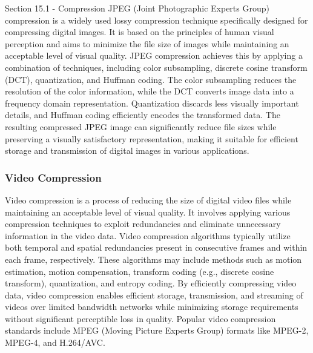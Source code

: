 \begin{notes}{Section 15.1 - Compression}
    JPEG (Joint Photographic Experts Group) compression is a widely used lossy compression technique specifically designed for compressing digital images. It is based on the principles of human visual 
    perception and aims to minimize the file size of images while maintaining an acceptable level of visual quality. JPEG compression achieves this by applying a combination of techniques, including color 
    subsampling, discrete cosine transform (DCT), quantization, and Huffman coding. The color subsampling reduces the resolution of the color information, while the DCT converts image data into a frequency 
    domain representation. Quantization discards less visually important details, and Huffman coding efficiently encodes the transformed data. The resulting compressed JPEG image can significantly reduce 
    file sizes while preserving a visually satisfactory representation, making it suitable for efficient storage and transmission of digital images in various applications.
    
    \subsubsection{Video Compression}
    
    Video compression is a process of reducing the size of digital video files while maintaining an acceptable level of visual quality. It involves applying various compression techniques to exploit 
    redundancies and eliminate unnecessary information in the video data. Video compression algorithms typically utilize both temporal and spatial redundancies present in consecutive frames and within each 
    frame, respectively. These algorithms may include methods such as motion estimation, motion compensation, transform coding (e.g., discrete cosine transform), quantization, and entropy coding. By efficiently 
    compressing video data, video compression enables efficient storage, transmission, and streaming of videos over limited bandwidth networks while minimizing storage requirements without significant 
    perceptible loss in quality. Popular video compression standards include MPEG (Moving Picture Experts Group) formats like MPEG-2, MPEG-4, and H.264/AVC.
\end{notes}

